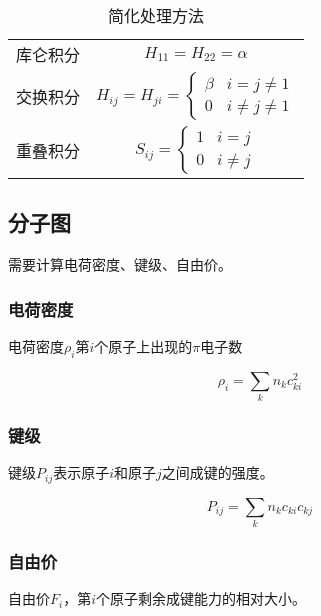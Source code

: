 \begin{table}[h]
	\centering
	\begin{tabular}{cc}
		库仑积分 & $H_{11} = H_{22} = \alpha$                 \\
		交换积分 & $H_{ij} = H_{ji} = \begin{cases}
				                              \beta & i = j \neq 1    \\
				                              0     & i \neq j \neq 1
			                              \end{cases}$ \\
		重叠积分 & $S_{ij} = \begin{cases}
				                     1 & i = j    \\
				                     0 & i \neq j
			                     \end{cases}$
	\end{tabular}
	\caption{简化处理方法}
	\label{tab:simplify}
\end{table}


\subsection{分子图}

需要计算电荷密度、键级、自由价。

\subsubsection{电荷密度}

电荷密度$\rho_i$第$i$个原子上出现的$\pi$电子数

\begin{equation*}
	\rho_i = \sum_{k} n_k c^2_{ki}
\end{equation*}

\subsubsection{键级}

键级$P_{ij}$表示原子$i$和原子$j$之间成键的强度。

\begin{equation*}
	P_{ij} = \sum_k n_k c_{ki} c_{kj}
\end{equation*}

\subsubsection{自由价}

自由价$F_i$，第$i$个原子剩余成键能力的相对大小。

